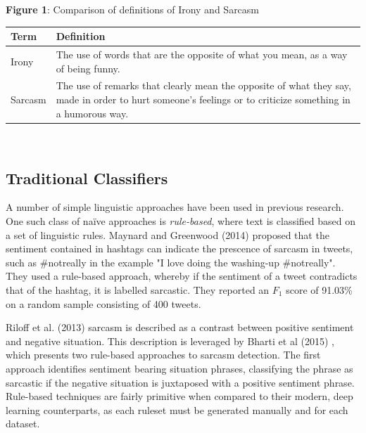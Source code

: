 \documentclass[12pt,a4paper]{article}
\begin{document}
\begin{center}
	\textbf{Figure 1}: Comparison of definitions of Irony and Sarcasm\vspace{-10pt}
\end{center}
\begin{center}
\begin{tabular}{p{1.5cm}p{13cm}}
	\hline
	\textbf{Term} & \textbf{Definition}\\
	\hline\hline
	Irony & The use of words that are the opposite of what you mean, as a way of being funny.
	\footnotemark[1]\\
	\hline
	Sarcasm & The use of remarks that clearly mean the opposite of what they say, made in order to hurt someone's feelings or to criticize something in a humorous way.\footnotemark[2]\\
	\hline
\end{tabular}\\
\end{center}\vspace{-10pt}

\subsection{Traditional Classifiers}\vspace{-10pt}
\noindent A number of simple linguistic approaches have been used in previous research. One such class of na\"{i}ve approaches is \textit{rule-based}, where text is classified based on a set of linguistic rules. Maynard and Greenwood (2014) \cite{maynard2014cares} proposed that the sentiment contained in hashtags can indicate the prescence of sarcasm in tweets, such as \#notreally in the example "I love doing the washing-up \#notreally". They used a rule-based approach, whereby if the sentiment of a tweet contradicts that of the hashtag, it is labelled sarcastic. They reported an $F_{1}$ score of 91.03\% on a random sample consisting of 400 tweets. 

Riloff et al. (2013) \cite{riloff2013sarcasm} sarcasm is described as a contrast between positive sentiment and negative situation. This description is leveraged by Bharti et al (2015) \cite{bharti2015parsing}, which presents two rule-based approaches to sarcasm detection. The first approach identifies sentiment bearing situation phrases, classifying the phrase as sarcastic if the negative situation is juxtaposed with a positive sentiment phrase. Rule-based techniques are fairly primitive when compared to their modern, deep learning counterparts, as each ruleset must be generated manually and for each dataset.
\end{document}

